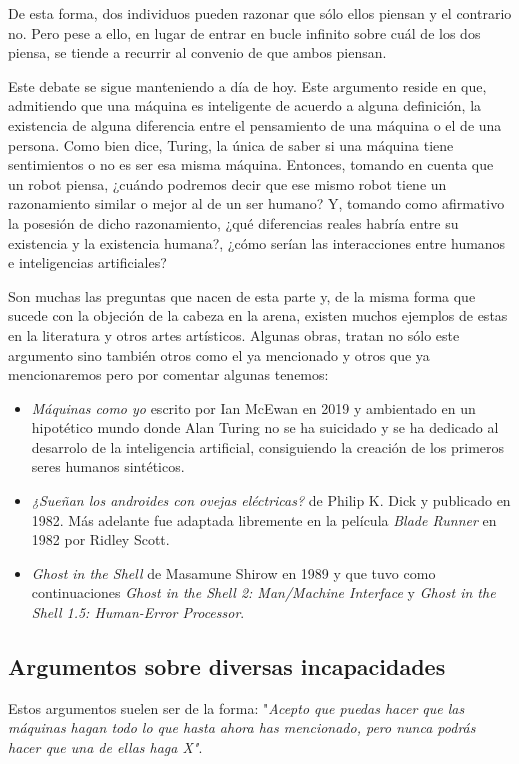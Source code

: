 \documentclass[12pt,a4paper]{article}
\begin{document}
De esta forma, dos individuos pueden razonar que sólo ellos piensan y el contrario no. Pero pese a ello, en lugar de entrar en bucle infinito sobre cuál de los dos piensa, se tiende a recurrir al convenio de que ambos piensan.

Este debate se sigue manteniendo a día de hoy. Este argumento reside en que, admitiendo que una máquina es inteligente de acuerdo a alguna definición, la existencia de alguna diferencia entre el pensamiento de una máquina o el de una persona. Como bien dice, Turing, la única de saber si una máquina tiene sentimientos o no es ser esa misma máquina. Entonces, tomando en cuenta que un robot piensa, ¿cuándo podremos decir que ese mismo robot tiene un razonamiento similar o mejor al de un ser humano? Y, tomando como afirmativo la posesión de dicho razonamiento, ¿qué diferencias reales habría entre su existencia y la existencia humana?, ¿cómo serían las interacciones entre humanos e inteligencias artificiales?

Son muchas las preguntas que nacen de esta parte y, de la misma forma que sucede con la objeción de la cabeza en la arena, existen muchos ejemplos de estas en la literatura y otros artes artísticos. Algunas obras, tratan no sólo este argumento sino también otros como el ya mencionado y otros que ya mencionaremos pero por comentar algunas tenemos:

\begin{itemize}
\item \emph{Máquinas como yo} escrito por Ian McEwan en 2019 y ambientado en un hipotético mundo donde Alan Turing no se ha suicidado y se ha dedicado al desarrolo de la inteligencia artificial, consiguiendo la creación de los primeros seres humanos sintéticos.
\item \emph{¿Sueñan los androides con ovejas eléctricas?} de Philip K. Dick y publicado en 1982. Más adelante fue adaptada libremente en la película \emph{Blade Runner} en 1982 por Ridley Scott.
\item \emph{Ghost in the Shell} de Masamune Shirow en 1989 y que tuvo como continuaciones \emph{Ghost in the Shell 2: Man/Machine Interface} y \emph{Ghost in the Shell 1.5: Human-Error Processor}.
\end{itemize}

\subsection{Argumentos sobre diversas incapacidades}
Estos argumentos suelen ser de la forma: "\emph{Acepto que puedas hacer que las máquinas hagan todo lo que hasta ahora has mencionado, pero nunca podrás hacer que una de ellas haga X"}.
\end{document}
